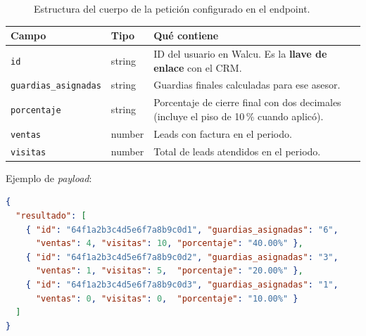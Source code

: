 \documentclass[11pt,a4paper]{article}
\newcommand{\code}[1]{\texttt{#1}}
\begin{document}
\begin{figure}[h!]
\centering
{}
\caption{Estructura del cuerpo de la petición configurado en el endpoint.}
\end{figure}

\begin{longtable}{@{}p{3.6cm}p{1.8cm}p{9.2cm}@{}}
\toprule
\textbf{Campo} & \textbf{Tipo} & \textbf{Qué contiene} \\
\midrule
\endhead
\code{id} & string & ID del usuario en Walcu. Es la \textbf{llave de enlace} con el CRM. \\
\code{guardias\_asignadas} & string & Guardias finales calculadas para ese asesor. \\
\code{porcentaje} & string & Porcentaje de cierre final con dos decimales (incluye el piso de 10\,\% cuando aplicó). \\
\code{ventas} & number & Leads con factura en el periodo. \\
\code{visitas} & number & Total de leads atendidos en el periodo. \\
\bottomrule
\end{longtable}

Ejemplo de \emph{payload}:

\begin{lstlisting}[style=codigo,language=json]
{
  "resultado": [
    { "id": "64f1a2b3c4d5e6f7a8b9c0d1", "guardias_asignadas": "6",
      "ventas": 4, "visitas": 10, "porcentaje": "40.00%" },
    { "id": "64f1a2b3c4d5e6f7a8b9c0d2", "guardias_asignadas": "3",
      "ventas": 1, "visitas": 5,  "porcentaje": "20.00%" },
    { "id": "64f1a2b3c4d5e6f7a8b9c0d3", "guardias_asignadas": "1",
      "ventas": 0, "visitas": 0,  "porcentaje": "10.00%" }
  ]
}
\end{lstlisting}
\end{document}
